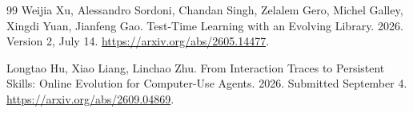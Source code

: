 \begin{thebibliography}{99}
Weijia Xu, Alessandro Sordoni, Chandan Singh, Zelalem Gero, Michel Galley, Xingdi Yuan, Jianfeng Gao.
Test-Time Learning with an Evolving Library.
2026.
Version 2, July 14.
\url{https://arxiv.org/abs/2605.14477}.

Longtao Hu, Xiao Liang, Linchao Zhu.
From Interaction Traces to Persistent Skills: Online Evolution for Computer-Use Agents.
2026.
Submitted September 4.
\url{https://arxiv.org/abs/2609.04869}.

\end{thebibliography}
